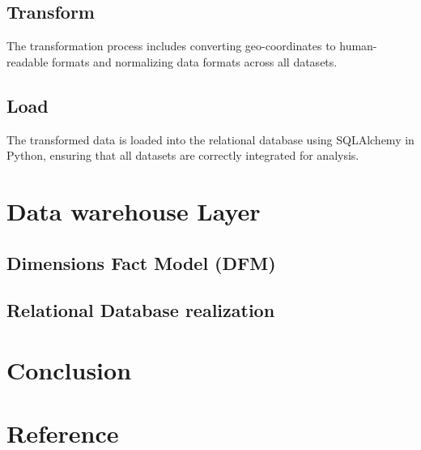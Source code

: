 \documentclass[conference]{IEEEtran}
\begin{document}
	
	\subsection{Transform}
	The transformation process includes converting geo-coordinates to human-readable formats and normalizing data formats across all datasets.
	
	\subsection{Load}
	The transformed data is loaded into the relational database using SQLAlchemy in Python, ensuring that all datasets are correctly integrated for analysis.
	
	\section{Data warehouse Layer}
	
	\subsection{Dimensions Fact Model (DFM)}
	
	\subsection{Relational Database realization}

	\section{Conclusion}
	
	\section{Reference}
	
	
	
	
	
\end{document}
